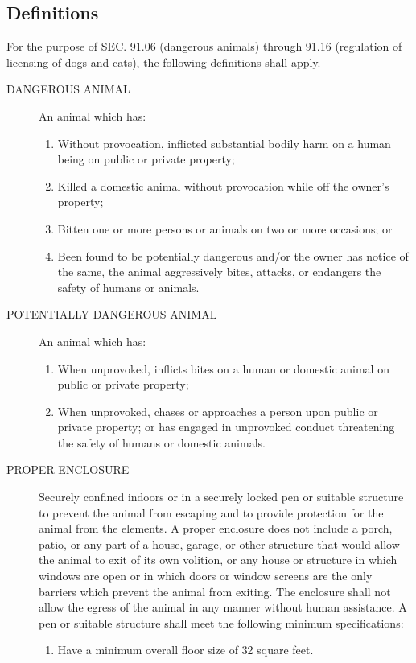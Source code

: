 \subsection{Definitions}
For the purpose of SEC. 91.06 (dangerous animals) through 91.16 (regulation of licensing of dogs and cats), the following definitions shall apply.
\begin{description}
\item[DANGEROUS ANIMAL] An animal which has:
\begin{enumerate}
\item Without provocation, inflicted substantial bodily harm on a human being on public or private property;
\item Killed a domestic animal without provocation while off the owner’s property;
\item Bitten one or more persons or animals on two or more occasions; or
\item Been found to be potentially dangerous and/or the owner has notice of the same, the animal aggressively bites, attacks, or endangers the safety of humans or animals.
\end{enumerate}
\item[POTENTIALLY DANGEROUS ANIMAL]  An animal which has:
\begin{enumerate}
\item When unprovoked, inflicts bites on a human or domestic animal on public or private property;
\item When unprovoked, chases or approaches a person upon public or private property; or has engaged in unprovoked conduct threatening the safety of humans or domestic animals.
\end{enumerate}
\item[PROPER ENCLOSURE]  Securely confined indoors or in a securely locked pen or suitable structure to prevent the animal from escaping and to provide protection for the animal from the elements.  A proper enclosure does not include a porch, patio, or any part of a house, garage, or other structure that would allow the animal to exit of its own volition, or any house or structure in which windows are open or in which doors or window screens are the only barriers which prevent the animal from exiting.  The enclosure shall not allow the egress of the animal in any manner without human assistance.  A pen or suitable structure shall meet the following minimum specifications:
\begin{enumerate}
\item Have a minimum overall floor size of 32 square feet.

\end{enumerate}
\end{description}

